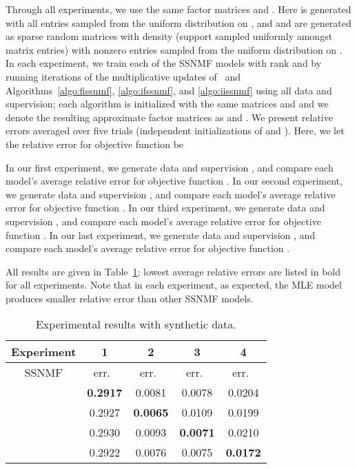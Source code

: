 \documentclass[twocolumn,10pt]{article}
\begin{document}
Through all experiments, we use the same factor matrices  and .  Here  is generated with all entries sampled from the uniform distribution on , and  and  are generated as sparse random matrices with density  (support sampled uniformly amongst matrix entries) with nonzero entries sampled from the uniform distribution on . In each experiment, we train each of the SSNMF models with rank  and  by running  iterations of the multiplicative updates of~\cite{lee2009semi} and Algorithms~\ref{algo:fissnmf}, \ref{algo:ifssnmf}, and \ref{algo:iissnmf} using all data and supervision; each algorithm is initialized with the same matrices  and  and we denote the resulting approximate factor matrices as  and . We present relative errors averaged over five trials (independent initializations of  and ).  Here, we let the relative error for objective function  be 


In our first experiment, we generate data  and supervision , 
and compare each model's average relative error for objective function .
In our second experiment, we generate data  and supervision , 
and compare each model's average relative error for objective function .
In our third experiment, we generate data  and supervision , 
and compare each model's average relative error for objective function .
In our last experiment, we generate data  and supervision , 
and compare each model's average relative error for objective function .

All results are given in Table~\ref{table:syntheticexperiment}; lowest average relative errors are listed in bold for all experiments.  Note that in each experiment, as expected, the MLE model produces smaller relative error than other SSNMF models.



\begin{table}[tb] 
\caption{Experimental results with synthetic data.}\label{table:syntheticexperiment}
{ \renewcommand{\arraystretch}{1.15}
\footnotesize
\centering
\begin{tabular}{| c | c | c | c | c |}
            \hline
            Experiment & 1 & 2 & 3 & 4 \\
            \hline
      SSNMF &  err.\ &  err.\ &  err.\ &  err.\ \\
            \hline
             & \textbf{0.2917} & 0.0081 & 0.0078 & 0.0204 \\
            \hline
             & 0.2927 & \textbf{0.0065} & 0.0109 & 0.0199 \\
            \hline
             & 0.2930 & 0.0093 & \textbf{0.0071} & 0.0210 \\
            \hline
             & 0.2922 & 0.0076 & 0.0075  & \textbf{0.0172} \\
\hline
\end{tabular}}
\end{table}
\end{document}
